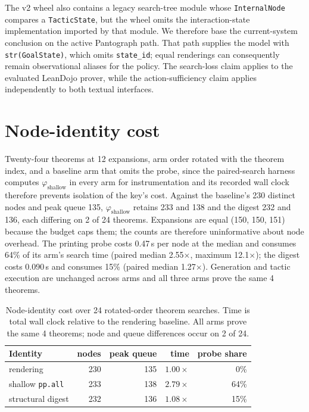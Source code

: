 \documentclass[11pt]{article}
\begin{document}
The v2 wheel also contains a legacy search-tree module whose
\texttt{InternalNode} compares a \texttt{TacticState}, but the wheel omits the
interaction-state implementation imported by that module. We therefore base the
current-system conclusion on the active Pantograph path. That path supplies the
model with \texttt{str(GoalState)}, which omits \texttt{state\_id}; equal
renderings can consequently remain observational aliases for the policy. The
search-loss claim applies to the evaluated LeanDojo prover, while the
action-sufficiency claim applies independently to both textual interfaces.

\section{Node-identity cost}
\label{app:cost}
Twenty-four theorems at 12 expansions, arm order rotated with the theorem index,
and a baseline arm that omits the probe, since the paired-search harness
computes $\varphi_{\text{shallow}}$ in every arm for instrumentation and its
recorded wall clock therefore prevents isolation of the key's cost. Against the
baseline's 230 distinct nodes and peak queue 135, $\varphi_{\text{shallow}}$
retains 233 and 138 and the digest 232 and 136, each differing on 2 of 24
theorems. Expansions are equal (150, 150, 151) because the budget caps them;
the counts are therefore uninformative about node overhead. The printing probe
costs 0.47\,s per node at the median and consumes 64\% of its arm's search time
(paired median 2.55$\times$, maximum 12.1$\times$); the digest costs 0.090\,s
and consumes 15\% (paired median 1.27$\times$). Generation and tactic execution
are unchanged across arms and all three arms prove the same 4 theorems.

\begin{table}[t]\centering\small
\setlength{\tabcolsep}{3.5pt}
\begin{tabular}{@{}lrrrr@{}}
\toprule
Identity & nodes & peak queue & time & probe share \\
\midrule
rendering & 230 & 135 & $1.00\times$ & 0\% \\
shallow \texttt{pp.all} & 233 & 138 & $2.79\times$ & 64\% \\
structural digest & 232 & 136 & $1.08\times$ & 15\% \\
\bottomrule
\end{tabular}
\caption{Node-identity cost over 24 rotated-order theorem searches. Time is
total wall clock relative to the rendering baseline. All arms prove the same
4 theorems; node and queue differences occur on 2 of 24.}
\label{tab:identity-cost}
\end{table}
\end{document}
